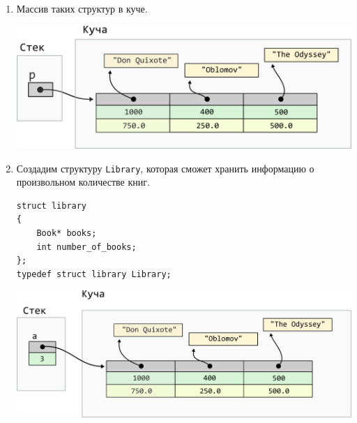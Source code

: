 \documentclass{article}
\begin{document}
\begin{enumerate}
\item Массив таких структур в куче.
\begin{center}
\includegraphics[scale=\mallocImagesScale]{../images/malloc_homework/08heap_array_struct_book_title_heap.png}
\end{center}


\item Создадим структуру \texttt{Library}, которая сможет хранить информацию о произвольном количестве книг.
\begin{lstlisting}
struct library 
{
    Book* books;
    int number_of_books;
};
typedef struct library Library;
\end{lstlisting}

\begin{center}
\includegraphics[scale=\mallocImagesScale]{../images/malloc_homework/09stack_struct_book_library.png}
\end{center}


\end{enumerate}
\end{document}
